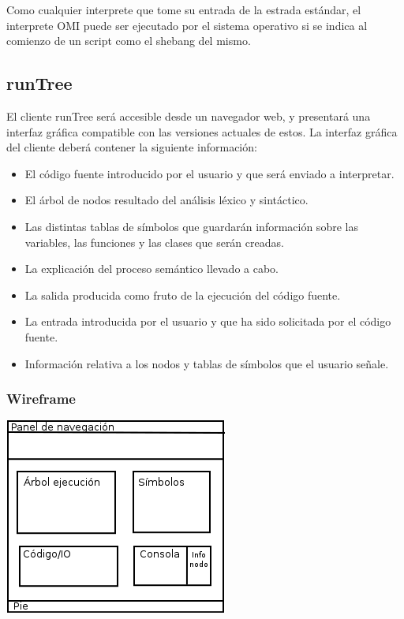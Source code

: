Como cualquier interprete que tome su entrada de la estrada estándar, el interprete OMI puede ser ejecutado por el 
sistema operativo si se indica al comienzo de un script como el shebang del mismo. 
\subsection{runTree}
El cliente runTree será accesible desde un navegador web, y presentará una interfaz gráfica compatible con las versiones actuales de estos.
La interfaz gráfica del cliente deberá contener la siguiente información:

\begin{itemize}
\item El código fuente introducido por el usuario y que será enviado a interpretar.
\item El árbol de nodos resultado del análisis léxico y sintáctico. 
\item Las distintas tablas de símbolos que guardarán información sobre las variables, las funciones y las clases que serán creadas.
\item La explicación del proceso semántico llevado a cabo. 
\item La salida producida como fruto de la ejecución del código fuente.
\item La entrada introducida por el usuario y que ha sido solicitada por el código fuente.
\item Información relativa a los nodos y tablas de símbolos que el usuario señale.
\end{itemize}

\subsubsection{Wireframe}
\begin{center}
\includegraphics[scale=0.6]{wireframe_runtree.png} \\
\end{center}

